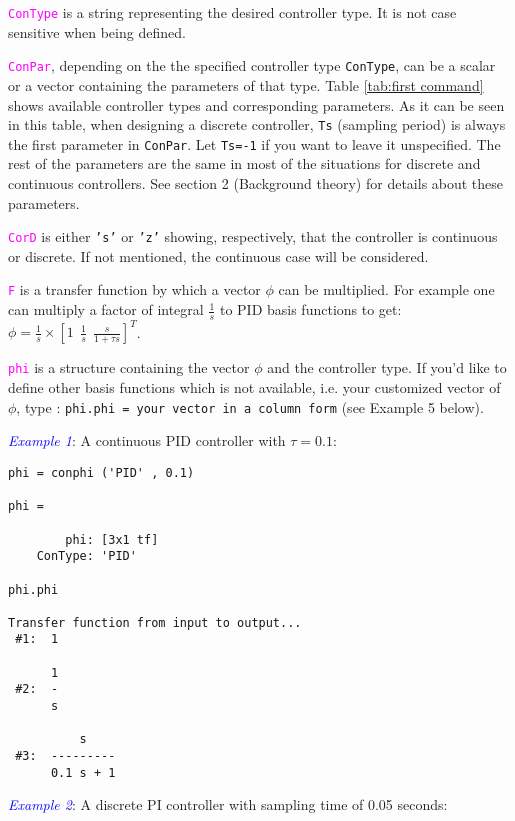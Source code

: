 \documentclass [12pt , a4paper] {article}
\begin{document}
\textcolor{magenta}{\texttt{ConType}} is a string representing the desired controller type. It is not case sensitive when being defined.

\textcolor{magenta}{\texttt{ConPar}}, depending on the the specified controller type \verb"ConType", can be a scalar or a vector containing the  parameters of that type. Table \ref{tab:first command} shows available controller types and corresponding parameters. As it can be seen in this table, when designing a discrete controller, \verb"Ts" (sampling period) is always the first parameter in \verb"ConPar". Let \texttt{Ts=-1} if you want to leave it unspecified. The rest of the parameters are the same in most of the situations for discrete and continuous controllers. See section 2 (Background theory) for details about these parameters.

\textcolor{magenta}{\texttt{CorD}} is either \texttt{'s'} or \texttt{'z'} showing, respectively, that the controller is continuous or discrete. If not mentioned, the continuous case will be considered. 

\textcolor{magenta}{\texttt{F}} is a transfer function by which a vector $\phi$ can be multiplied. For example one can multiply a factor of integral $\frac{1}{s}$ to PID basis functions to get: $\phi=\frac{1}{s} \times [1\:\: \frac{1}{s} \:\: \frac{s}{1+\tau s}]^T$. 

\textcolor{magenta}{\texttt{phi}} is a structure containing the vector $\phi$ and the controller type. If you'd like to define other basis functions which is not available, i.e. your customized vector of $\phi$, type : \texttt{phi.phi = your vector in a column form} (see Example 5 below).

\textcolor{blue}{\emph{Example 1}}: A continuous PID controller with $\tau=0.1$:

\begin{lstlisting}
phi = conphi ('PID' , 0.1) 

phi = 

        phi: [3x1 tf]
    ConType: 'PID'

phi.phi
 
Transfer function from input to output...
 #1:  1
 
      1
 #2:  -
      s
 
          s
 #3:  ---------
      0.1 s + 1      
\end{lstlisting}

\textcolor{blue}{\emph{Example 2}}: A discrete PI controller with sampling time of 0.05 seconds:
\end{document}
